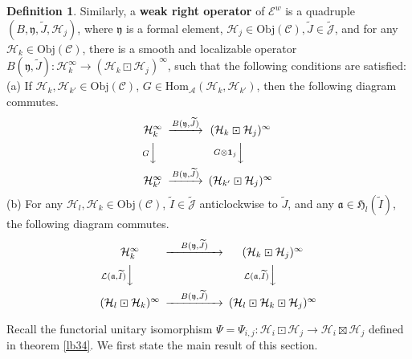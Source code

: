 \documentclass[12pt,a4paper]{article}
\theoremstyle{definition}
\newtheorem{df}{Definition}[subsection]
\theoremstyle{plain}
\newcommand{\fk}{\mathfrak}
\newcommand{\mc}{\mathcal}
\newcommand{\wtd}{\widetilde}
\newcommand{\id}{\mathbf{1}}
\newcommand{\Hom}{\mathrm{Hom}}
\newcommand{\scr}{\mathscr}
\newcommand{\Jtd}{\widetilde{\mathcal J}}
\newcommand{\Obj}{\mathrm{Obj}}
\numberwithin{equation}{subsection}
\begin{document}
\begin{df}
	Similarly, a \textbf{weak right operator} of $\scr E^w$ is a quadruple $(B,\fk y,\wtd J,\mc H_j)$, where $\fk y$ is a formal element, $\mc H_j\in\Obj(\scr C),\wtd J\in\Jtd$, and for any $\mc H_k\in\Obj(\scr C)$, there is a smooth and localizable operator $B(\fk y,\wtd J):\mc H_k^\infty\rightarrow(\mc H_k\boxdot\mc H_j)^\infty$, such that the following conditions are satisfied:\\
	(a) If $\mc H_k,\mc H_{k'}\in\Obj(\scr C)$, $G\in\Hom_{\mc A}(\mc H_k,\mc H_{k'})$, then  the following diagram commutes.
	\begin{gather}
	\begin{CD}
	\mc H_k^\infty  @> B(\fk y,\wtd J)  >> (\mc H_k\boxdot\mc H_j)^\infty\\
	@V G VV @V G\otimes\id_j  VV\\
	\mc H_{k'}^\infty @>B(\fk y,\wtd J) >> (\mc H_{k'}\boxdot\mc H_j)^\infty
	\end{CD}
	\end{gather}
	(b) For any $\mc H_l,\mc H_k\in\Obj(\scr C)$,  $\wtd I\in\Jtd$  anticlockwise to $\wtd J$, and any $\fk a\in\fk H_l(\wtd I)$, the following diagram  commutes.
	\begin{align}
	\begin{CD}
	\mc H_k^\infty @> \quad B(\fk y,\wtd J)\quad   >> (\mc H_k\boxdot\mc H_j)^\infty\\
	@V \mc L(\fk a,\wtd I)   V  V @V \mc L(\fk a,\wtd I) VV\\
(\mc H_l\boxdot\mc H_k)^\infty @> \quad B(\fk y,\wtd J) \quad  >> (\mc H_l\boxdot\mc H_k\boxdot\mc H_j)^\infty
	\end{CD}
	\end{align}
\end{df}

Recall the functorial unitary isomorphism $\Psi=\Psi_{i,j}:\mc H_i\boxdot\mc H_j\rightarrow\mc H_i\boxtimes\mc H_j$ defined in theorem \ref{lb34}. We first state the main result of this section.
\end{document}
